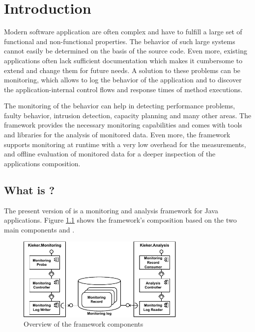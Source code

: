 % 


\chapter{Introduction}\label{chap:introduction}

Modern software application are often complex and have to fulfill a large set of functional and non-functional properties. The behavior of such large systems cannot easily be determined on the basis of the source code. Even more, existing applications often lack sufficient documentation which makes it cumbersome to extend and change them for future needs. A solution to these problems can be monitoring, which allows to log the behavior of the application and to discover the application-internal control flows and response times of method executions.

The monitoring of the behavior can help in detecting performance problems, faulty behavior, intrusion detection, capacity planning and many other areas. The \Kieker{} framework provides the necessary monitoring capabilities and comes with tools and libraries for the analysis of monitored data. Even more, the framework supports monitoring at runtime with a very low overhead for the measurements, and offline evaluation of monitored data for a deeper inspection of the applications composition. 

\section{What is \Kieker?}\label{sec:kieker}

The present version of \Kieker{} is a monitoring and analysis framework for Java applications. Figure \ref{fig:KiekerComponentDiagram} shows the framework's composition based on the two main components \KiekerMonitoringPart{} and \KiekerAnalysisPart{}. 

\begin{figure}[H]\centering
\includegraphics[width=0.73\textwidth]{images/kiekerComponentDiagram-woCloud-bw-w-record-newNames}
\caption{Overview of the framework components}
\label{fig:KiekerComponentDiagram}
\end{figure}
		
